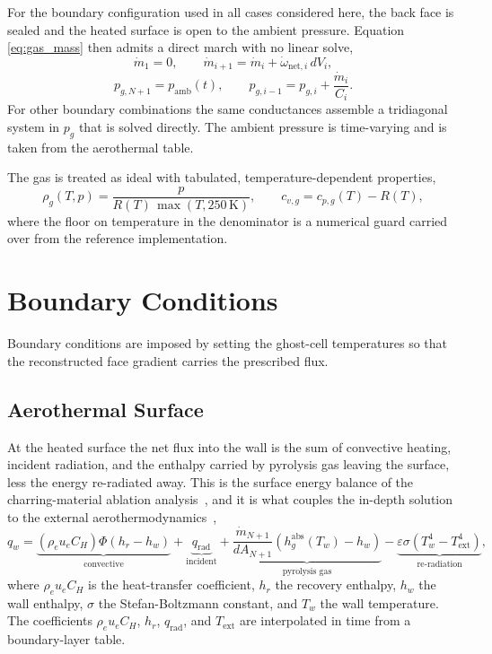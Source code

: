\documentclass[11pt]{report}
\begin{document}
For the boundary configuration used in all cases considered here, the back face
is sealed and the heated surface is open to the ambient pressure. Equation
\eqref{eq:gas_mass} then admits a direct march with no linear solve,
\begin{equation}
\dot m_1 = 0, \qquad
\dot m_{i+1} = \dot m_i + \dot\omega_{\mathrm{net},i}\, dV_i,
\end{equation}
\begin{equation}
p_{g,N+1} = p_{\mathrm{amb}}(t), \qquad
p_{g,i-1} = p_{g,i} + \frac{\dot m_i}{C_i} .
\end{equation}
For other boundary combinations the same conductances assemble a tridiagonal
system in $p_g$ that is solved directly. The ambient pressure is time-varying and
is taken from the aerothermal table.

The gas is treated as ideal with tabulated, temperature-dependent properties,
\begin{equation}
\rho_g(T, p) = \frac{p}{R(T)\,\max(T, 250\,\mathrm{K})},
\qquad
c_{v,g} = c_{p,g}(T) - R(T),
\end{equation}
where the floor on temperature in the denominator is a numerical guard carried
over from the reference implementation.

\section{Boundary Conditions}

Boundary conditions are imposed by setting the ghost-cell temperatures so that
the reconstructed face gradient carries the prescribed flux.

\subsection{Aerothermal Surface}

At the heated surface the net flux into the wall is the sum of convective
heating, incident radiation, and the enthalpy carried by pyrolysis gas leaving the
surface, less the energy re-radiated away. This is the surface energy balance of
the charring-material ablation analysis~\cite{moyer1968cma}, and it is what
couples the in-depth solution to the external
aerothermodynamics~\cite{martin2015coupled},
\begin{equation}
q_w = \underbrace{\left(\rho_e u_e C_H\right) \Phi \left(h_r - h_w\right)}_{\text{convective}}
    + \underbrace{q_{\mathrm{rad}}}_{\text{incident}}
    + \underbrace{\frac{\dot m_{N+1}}{dA_{N+1}}\left(h_g^{\mathrm{abs}}(T_w) - h_w\right)}_{\text{pyrolysis gas}}
    - \underbrace{\varepsilon \sigma \left(T_w^4 - T_{\mathrm{ext}}^4\right)}_{\text{re-radiation}} ,
\label{eq:surface_balance}
\end{equation}
where $\rho_e u_e C_H$ is the heat-transfer coefficient, $h_r$ the recovery
enthalpy, $h_w$ the wall enthalpy, $\sigma$ the Stefan-Boltzmann constant, and
$T_w$ the wall temperature. The coefficients $\rho_e u_e C_H$, $h_r$,
$q_{\mathrm{rad}}$, and $T_{\mathrm{ext}}$ are interpolated in time from a
boundary-layer table.
\end{document}
